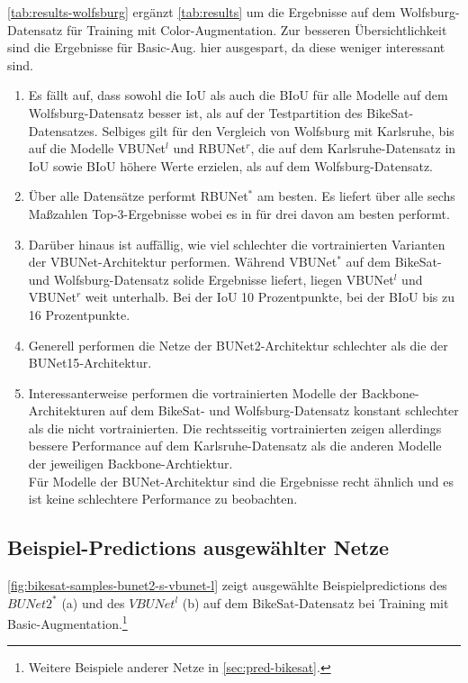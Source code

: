\autoref{tab:results-wolfsburg} ergänzt \autoref{tab:results} um die Ergebnisse auf dem Wolfsburg-Datensatz für 
Training mit Color-Augmentation. Zur besseren Übersichtlichkeit sind die Ergebnisse für Basic-Aug. hier ausgespart, 
da diese weniger interessant sind. 
\begin{enumerate}
	\item Es fällt auf, dass sowohl die \ac{IoU} als auch die \ac{BIoU} für alle Modelle
	auf dem Wolfsburg-Datensatz besser ist, als auf der Testpartition des BikeSat-Datensatzes.  
	Selbiges gilt für den Vergleich von Wolfsburg mit Karlsruhe, bis auf die Modelle VBUNet$^l$ und 
	RBUNet$^r$, die auf dem Karlsruhe-Datensatz in IoU sowie BIoU höhere Werte erzielen, als auf dem Wolfsburg-Datensatz.
	\item Über alle Datensätze performt RBUNet$^*$ am besten. Es liefert über alle sechs Maßzahlen Top-3-Ergebnisse wobei es 
	in für drei davon am besten performt. 
	\item Darüber hinaus ist auffällig, wie viel schlechter die vortrainierten Varianten der VBUNet-Architektur performen. 
	Während VBUNet$^*$ auf dem BikeSat- und Wolfsburg-Datensatz solide Ergebnisse liefert, liegen VBUNet$^l$ und VBUNet$^r$ 
	weit unterhalb. Bei der IoU 10 Prozentpunkte, bei der BIoU bis zu 16 Prozentpunkte.
	\item Generell performen die Netze der \ac{BUNet2}-Architektur schlechter als die der \ac{BUNet15}-Architektur.
	\item Interessanterweise performen die vortrainierten Modelle der Backbone-Architekturen auf dem BikeSat- und 
	Wolfsburg-Datensatz konstant schlechter als die nicht vortrainierten. Die rechtsseitig vortrainierten zeigen 
	allerdings bessere Performance auf dem Karlsruhe-Datensatz als die anderen Modelle der jeweiligen Backbone-Archtiektur.\\
	Für Modelle der BUNet-Architektur sind die Ergebnisse recht ähnlich und es ist keine schlechtere Performance
	zu beobachten. 
\end{enumerate}


\subsection{Beispiel-Predictions ausgewählter Netze}

\autoref{fig:bikesat-samples-bunet2-s-vbunet-l} zeigt ausgewählte Beispielpredictions des $BUNet2^*$ (a) und 
des $VBUNet^l$ (b) auf dem BikeSat-Datensatz bei Training mit Basic-Augmentation.\footnote{Weitere Beispiele anderer Netze in \autoref{sec:pred-bikesat}.}

